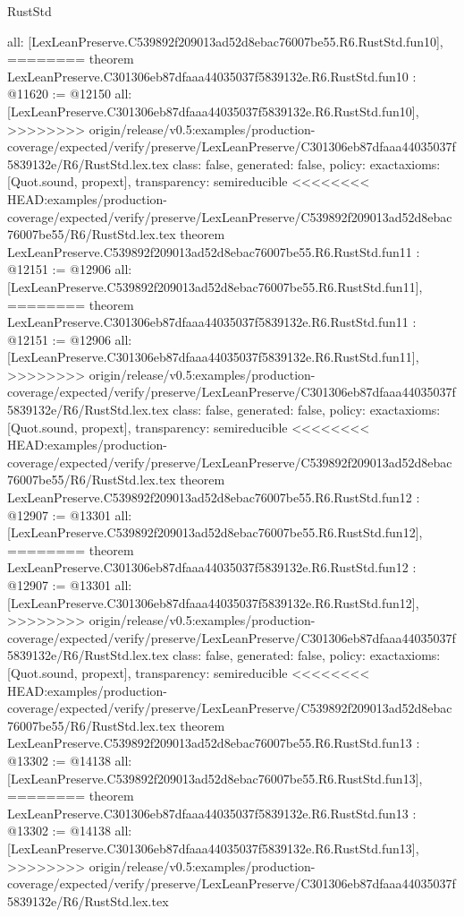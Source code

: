 \begin{lexlean}{RustStd}
\begin{coremodule}
{\begin{coremodule}
{{{{{{{{{{{{{  all: [LexLeanPreserve.C539892f209013ad52d8ebac76007be55.R6.RustStd.fun10],
========
theorem LexLeanPreserve.C301306eb87dfaaa44035037f5839132e.R6.RustStd.fun10 : @11620 := @12150 {
  all: [LexLeanPreserve.C301306eb87dfaaa44035037f5839132e.R6.RustStd.fun10],
>>>>>>>> origin/release/v0.5:examples/production-coverage/expected/verify/preserve/LexLeanPreserve/C301306eb87dfaaa44035037f5839132e/R6/RustStd.lex.tex
  class: false,
  generated: false,
  policy: exact{axioms: [Quot.sound, propext]},
  transparency: semireducible
}
<<<<<<<< HEAD:examples/production-coverage/expected/verify/preserve/LexLeanPreserve/C539892f209013ad52d8ebac76007be55/R6/RustStd.lex.tex
theorem LexLeanPreserve.C539892f209013ad52d8ebac76007be55.R6.RustStd.fun11 : @12151 := @12906 {
  all: [LexLeanPreserve.C539892f209013ad52d8ebac76007be55.R6.RustStd.fun11],
========
theorem LexLeanPreserve.C301306eb87dfaaa44035037f5839132e.R6.RustStd.fun11 : @12151 := @12906 {
  all: [LexLeanPreserve.C301306eb87dfaaa44035037f5839132e.R6.RustStd.fun11],
>>>>>>>> origin/release/v0.5:examples/production-coverage/expected/verify/preserve/LexLeanPreserve/C301306eb87dfaaa44035037f5839132e/R6/RustStd.lex.tex
  class: false,
  generated: false,
  policy: exact{axioms: [Quot.sound, propext]},
  transparency: semireducible
}
<<<<<<<< HEAD:examples/production-coverage/expected/verify/preserve/LexLeanPreserve/C539892f209013ad52d8ebac76007be55/R6/RustStd.lex.tex
theorem LexLeanPreserve.C539892f209013ad52d8ebac76007be55.R6.RustStd.fun12 : @12907 := @13301 {
  all: [LexLeanPreserve.C539892f209013ad52d8ebac76007be55.R6.RustStd.fun12],
========
theorem LexLeanPreserve.C301306eb87dfaaa44035037f5839132e.R6.RustStd.fun12 : @12907 := @13301 {
  all: [LexLeanPreserve.C301306eb87dfaaa44035037f5839132e.R6.RustStd.fun12],
>>>>>>>> origin/release/v0.5:examples/production-coverage/expected/verify/preserve/LexLeanPreserve/C301306eb87dfaaa44035037f5839132e/R6/RustStd.lex.tex
  class: false,
  generated: false,
  policy: exact{axioms: [Quot.sound, propext]},
  transparency: semireducible
}
<<<<<<<< HEAD:examples/production-coverage/expected/verify/preserve/LexLeanPreserve/C539892f209013ad52d8ebac76007be55/R6/RustStd.lex.tex
theorem LexLeanPreserve.C539892f209013ad52d8ebac76007be55.R6.RustStd.fun13 : @13302 := @14138 {
  all: [LexLeanPreserve.C539892f209013ad52d8ebac76007be55.R6.RustStd.fun13],
========
theorem LexLeanPreserve.C301306eb87dfaaa44035037f5839132e.R6.RustStd.fun13 : @13302 := @14138 {
  all: [LexLeanPreserve.C301306eb87dfaaa44035037f5839132e.R6.RustStd.fun13],
>>>>>>>> origin/release/v0.5:examples/production-coverage/expected/verify/preserve/LexLeanPreserve/C301306eb87dfaaa44035037f5839132e/R6/RustStd.lex.tex
}}}}}}}}}}}}}}}}}
\end{coremodule}}
\end{coremodule}
\end{lexlean}
